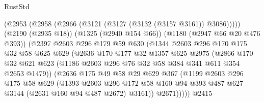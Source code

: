 \begin{lexlean}{RustStd}
\begin{coremodule}
                            (@2953 (@2958 (@2966 (@3121 (@3127 (@3132 (@3157 @3161)) @3086)))))
                            (@2190 (@2935 @18))
                            (@1325 (@2940 @154 @66))
                            (@1180 (@2947 @66 @20 @476 @393))
                            (@2397
                              @2603
                              @296
                              @179
                              @59
                              @630
                              (@1344
                                @2603
                                @296
                                @170
                                @175
                                @32
                                @58
                                @625
                                @629
                                (@2636
                                  @170
                                  @177
                                  @32
                                  @1357
                                  @625
                                  @2975
                                  (@2866
                                    @170
                                    @32
                                    @621
                                    @623
                                    (@1186 @2603 @296 @76 @32 @58 @384 @341 @611 @354 @2653 @1479))
                                  (@2636
                                    @175
                                    @49
                                    @58
                                    @29
                                    @629
                                    @367
                                    (@1199
                                      @2603
                                      @296
                                      @175
                                      @58
                                      @629
                                      (@1393
                                        @2603
                                        @296
                                        @172
                                        @58
                                        @160
                                        @94
                                        @393
                                        @487
                                        @627
                                        @3144
                                        (@2631 @160 @94 @487 @2672)
                                        @3161))
                                    @2671)))))
                          @2415

\end{coremodule}
\end{lexlean}
